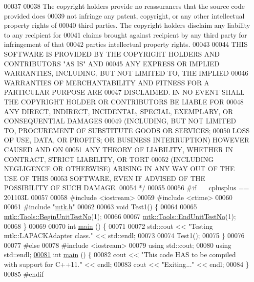 \begin{DoxyCode}
00037 \textcolor{comment}{}
00038 \textcolor{comment}{The copyright holders provide no reassurances that the source code provided does}
00039 \textcolor{comment}{not infringe any patent, copyright, or any other intellectual property rights of}
00040 \textcolor{comment}{third parties. The copyright holders disclaim any liability to any recipient for}
00041 \textcolor{comment}{claims brought against recipient by any third party for infringement of that}
00042 \textcolor{comment}{parties intellectual property rights.}
00043 \textcolor{comment}{}
00044 \textcolor{comment}{THIS SOFTWARE IS PROVIDED BY THE COPYRIGHT HOLDERS AND CONTRIBUTORS "AS IS" AND}
00045 \textcolor{comment}{ANY EXPRESS OR IMPLIED WARRANTIES, INCLUDING, BUT NOT LIMITED TO, THE IMPLIED}
00046 \textcolor{comment}{WARRANTIES OF MERCHANTABILITY AND FITNESS FOR A PARTICULAR PURPOSE ARE}
00047 \textcolor{comment}{DISCLAIMED. IN NO EVENT SHALL THE COPYRIGHT HOLDER OR CONTRIBUTORS BE LIABLE FOR}
00048 \textcolor{comment}{ANY DIRECT, INDIRECT, INCIDENTAL, SPECIAL, EXEMPLARY, OR CONSEQUENTIAL DAMAGES}
00049 \textcolor{comment}{(INCLUDING, BUT NOT LIMITED TO, PROCUREMENT OF SUBSTITUTE GOODS OR SERVICES;}
00050 \textcolor{comment}{LOSS OF USE, DATA, OR PROFITS; OR BUSINESS INTERRUPTION) HOWEVER CAUSED AND ON}
00051 \textcolor{comment}{ANY THEORY OF LIABILITY, WHETHER IN CONTRACT, STRICT LIABILITY, OR TORT}
00052 \textcolor{comment}{(INCLUDING NEGLIGENCE OR OTHERWISE) ARISING IN ANY WAY OUT OF THE USE OF THIS}
00053 \textcolor{comment}{SOFTWARE, EVEN IF ADVISED OF THE POSSIBILITY OF SUCH DAMAGE.}
00054 \textcolor{comment}{*/}
00055 
00056 \textcolor{preprocessor}{#if \_\_cplusplus == 201103L}
00057 
00058 \textcolor{preprocessor}{#include <iostream>}
00059 \textcolor{preprocessor}{#include <ctime>}
00060 
00061 \textcolor{preprocessor}{#include "\hyperlink{mtk_8h}{mtk.h}"}
00062 
00063 \textcolor{keywordtype}{void} Test1() \{
00064 
00065   \hyperlink{classmtk_1_1Tools_a26ee906d28523378522a75e25c3a4e19}{mtk::Tools::BeginUnitTestNo}(1);
00066 
00067   \hyperlink{classmtk_1_1Tools_ad8cf0085133dd40c913fe195bc5b9694}{mtk::Tools::EndUnitTestNo}(1);
00068 \}
00069 
00070 \textcolor{keywordtype}{int} \hyperlink{mtk__lapack__adapter__test_8cc_ae66f6b31b5ad750f1fe042a706a4e3d4}{main} () \{
00071 
00072   std::cout << \textcolor{stringliteral}{"Testing mtk::LAPACKAdapter class."} << std::endl;
00073 
00074   Test1();
00075 \}
00076 
00077 \textcolor{preprocessor}{#else}
00078 \textcolor{preprocessor}{#include <iostream>}
00079 \textcolor{keyword}{using} std::cout;
00080 \textcolor{keyword}{using} std::endl;
\hypertarget{mtk__lapack__adapter__test_8cc_source_l00081}{}\hyperlink{mtk__lapack__adapter__test_8cc_ae66f6b31b5ad750f1fe042a706a4e3d4}{00081} \textcolor{keywordtype}{int} \hyperlink{mtk__lapack__adapter__test_8cc_ae66f6b31b5ad750f1fe042a706a4e3d4}{main} () \{
00082   cout << \textcolor{stringliteral}{"This code HAS to be compiled with support for C++11."} << endl;
00083   cout << \textcolor{stringliteral}{"Exiting..."} << endl;
00084 \}
00085 \textcolor{preprocessor}{#endif}
\end{DoxyCode}
